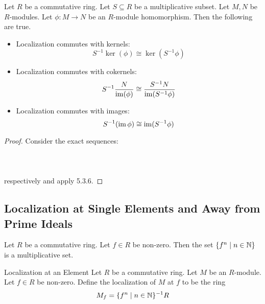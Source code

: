 \documentclass[a4paper]{article}
\begin{document}
\begin{lmm}{}{} Let $R$ be a commutative ring. Let $S\subseteq R$ be a multiplicative subset. Let $M,N$ be $R$-modules. Let $\phi:M\to N$ be an $R$-module homomorphism. Then the following are true. 
\begin{itemize}
\item Localization commutes with kernels: $$S^{-1}\ker(\phi)\cong\ker(S^{-1}\phi)$$
\item Localization commutes with cokernels: $$S^{-1}\frac{N}{\operatorname{im}(\phi)}\cong\frac{S^{-1}N}{\operatorname{im}(S^{-1}\phi)}$$
\item Localization commutes with images: $$S^{-1}(\operatorname{im}\phi)\cong\operatorname{im}(S^{-1}\phi)$$
\end{itemize} \tcbline
\begin{proof}
Consider the exact sequences: \\~\\
\\~\\
respectively and apply 5.3.6. 
\end{proof}
\end{lmm}

\subsection{Localization at Single Elements and Away from Prime Ideals}
\begin{lmm}{}{} Let $R$ be a commutative ring. Let $f\in R$ be non-zero. Then the set $\{f^n\;|\;n\in\mathbb{N}\}$ is a multiplicative set. 
\end{lmm}

\begin{defn}{Localization at an Element}{} Let $R$ be a commutative ring. Let $M$ be an $R$-module. Let $f\in R$ be non-zero. Define the localization of $M$ at $f$ to be the ring $$M_f=\{f^n\;|\;n\in\mathbb{N}\}^{-1}R$$
\end{defn}
\end{document}
